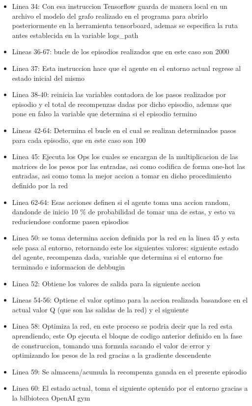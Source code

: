 \begin{itemize}
    \item Linea 34: Con esa instruccion Tensorflow guarda de manera local en un archivo el modelo del grafo realizado en el programa para abrirlo posteriormente en la herramienta tensorboard, ademas se especifica la ruta antes establecida en la variable logs\_path
	\item Lineas 36-67: bucle de los episodios realizados que en este caso son 2000
	\item Linea 37: Esta instruccion hace que el agente en el entorno actual regrese al estado inicial del mismo
	\item Linea 38-40: reinicia las variables contadora de los pasos realizados por episodio y el total de recompenzas dadas por dicho episodio, ademas que pone en falso la variable que determina si el episodio termino
	\item Lineas 42-64: Determina el bucle en el cual se realizan determinados pasos para cada episodio, que en este caso son 100
	\item Linea 45: Ejecuta los Ops los cuales se encargan de la multiplicacion de las matrices de los pesos por las entradas, asi como codifica de forma one-hot las entradas, asi como toma la mejor accion a tomar en dicho procedimiento definido por la red
	\item Linea 62-64: Esas acciones definen si el agente toma una accion random, dandonde de inicio 10 \% de probabilidad de tomar una de estas, y esto va reduciendose conforme pasen episodios
	\item Linea 50: se toma determina accion definida por la red en la linea 45 y esta sele pasa al entorno, retornando este los siguientes valores: siguiente estado del agente, recompenza dada, variable que determina si el entorno fue terminado e informacion de debbugin
	\item Linea 52: Obtiene los valores de salida para la siguiente accion
	\item Lineas 54-56: Optiene el valor optimo para la accion realizada basandose en el actual valor Q (que son las salidas de la red) y el siguiente
	\item Linea 58: Optimiza la red, en este proceso se podria decir que la red esta aprendiendo, este Op ejecuta el bloque de codigo anterior definido en la fase de construccion, tomando una formula sacando el valor de error y optimizando los pesos de la red gracias a la gradiente descendente
	\item Linea 59: Se almacena/acumula la recompenza ganada en el presente episodio 
	\item Linea 60: El estado actual, toma el siguiente optenido por el entorno gracias a la bilbioteca OpenAI gym

\end{itemize}
